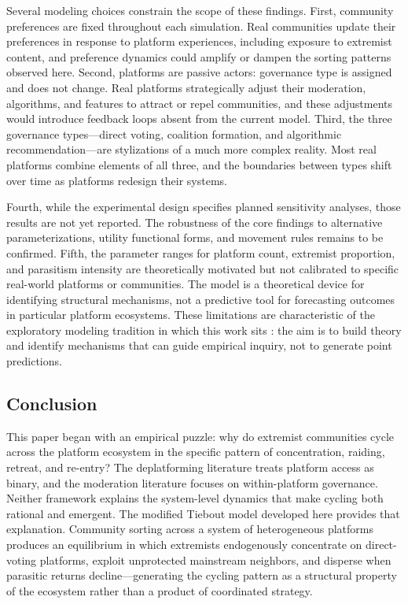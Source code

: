 Several modeling choices constrain the scope of these findings. First, community preferences are fixed throughout each simulation. Real communities update their preferences in response to platform experiences, including exposure to extremist content, and preference dynamics could amplify or dampen the sorting patterns observed here. Second, platforms are passive actors: governance type is assigned and does not change. Real platforms strategically adjust their moderation, algorithms, and features to attract or repel communities, and these adjustments would introduce feedback loops absent from the current model. Third, the three governance types---direct voting, coalition formation, and algorithmic recommendation---are stylizations of a much more complex reality. Most real platforms combine elements of all three, and the boundaries between types shift over time as platforms redesign their systems.

Fourth, while the experimental design specifies planned sensitivity analyses, those results are not yet reported. The robustness of the core findings to alternative parameterizations, utility functional forms, and movement rules remains to be confirmed. Fifth, the parameter ranges for platform count, extremist proportion, and parasitism intensity are theoretically motivated but not calibrated to specific real-world platforms or communities. The model is a theoretical device for identifying structural mechanisms, not a predictive tool for forecasting outcomes in particular platform ecosystems. These limitations are characteristic of the exploratory modeling tradition in which this work sits \citep{bankesExploratoryModelingPolicy1993}: the aim is to build theory and identify mechanisms that can guide empirical inquiry, not to generate point predictions.

\subsection{Conclusion}

This paper began with an empirical puzzle: why do extremist communities cycle across the platform ecosystem in the specific pattern of concentration, raiding, retreat, and re-entry? The deplatforming literature treats platform access as binary, and the moderation literature focuses on within-platform governance. Neither framework explains the system-level dynamics that make cycling both rational and emergent. The modified Tiebout model developed here provides that explanation. Community sorting across a system of heterogeneous platforms produces an equilibrium in which extremists endogenously concentrate on direct-voting platforms, exploit unprotected mainstream neighbors, and disperse when parasitic returns decline---generating the cycling pattern as a structural property of the ecosystem rather than a product of coordinated strategy.

